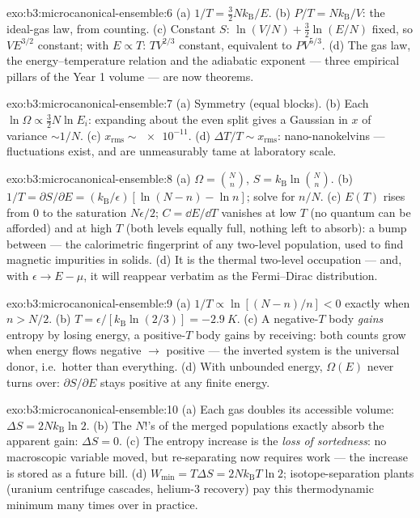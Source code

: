 \begin{solution}{exo:b3:microcanonical-ensemble:6}
(a) $1/T = \tfrac32 Nk_{\text{B}}/E$. (b) $P/T =
Nk_{\text{B}}/V$: the ideal-gas law, from counting. (c) Constant
$S$: $\ln(V/N) + \tfrac32\ln(E/N)$ fixed, so $VE^{3/2}$ constant;
with $E \propto T$: $TV^{2/3}$ constant, equivalent to
$PV^{5/3}$. (d) The gas law, the energy--temperature relation and
the adiabatic exponent --- three empirical pillars of the Year 1
volume --- are now theorems.
\end{solution}

\begin{solution}{exo:b3:microcanonical-ensemble:7}
(a) Symmetry (equal blocks). (b) Each $\ln\Omega \propto
\tfrac32 N\ln E_i$: expanding about the even split gives a
Gaussian in $x$ of variance $\sim1/N$. (c) $x_{\text{rms}} \sim
\num{e-11}$. (d) $\Delta T/T \sim x_{\text{rms}}$:
nano-nanokelvins --- fluctuations exist, and are unmeasurably
tame at laboratory scale.
\end{solution}

\begin{solution}{exo:b3:microcanonical-ensemble:8}
(a) $\Omega = \binom Nn$, $S = k_{\text{B}}\ln\binom Nn$. (b)
$1/T = \partial S/\partial E = (k_{\text{B}}/\epsilon)[\ln(N-n) -
\ln n]$; solve for $n/N$. (c) $E(T)$ rises from $0$ to the
saturation $N\epsilon/2$; $C = \dd E/\dd T$ vanishes at low $T$
(no quantum can be afforded) and at high $T$ (both levels equally
full, nothing left to absorb): a bump between --- the calorimetric
fingerprint of any two-level population, used to find magnetic
impurities in solids. (d) It is the thermal two-level occupation
--- and, with $\epsilon \to E - \mu$, it will reappear verbatim as
the Fermi--Dirac distribution.
\end{solution}

\begin{solution}{exo:b3:microcanonical-ensemble:9}
(a) $1/T \propto \ln[(N-n)/n] < 0$ exactly when $n > N/2$. (b)
$T = \epsilon/[k_{\text{B}}\ln(2/3)] = -\qty{2.9}{K}$. (c) A
negative-$T$ body \emph{gains} entropy by losing energy, a
positive-$T$ body gains by receiving: both counts grow when energy
flows negative $\to$ positive --- the inverted system is the
universal donor, i.e.\ hotter than everything. (d) With unbounded
energy, $\Omega(E)$ never turns over: $\partial S/\partial E$
stays positive at any finite energy.
\end{solution}

\begin{solution}{exo:b3:microcanonical-ensemble:10}
(a) Each gas doubles its accessible volume: $\Delta S =
2Nk_{\text{B}}\ln2$. (b) The $N!$'s of the merged populations
exactly absorb the apparent gain: $\Delta S = 0$. (c) The entropy
increase is the \emph{loss of sortedness}: no macroscopic variable
moved, but re-separating now requires work --- the increase is
stored as a future bill. (d) $W_{\min} = T\Delta S =
2Nk_{\text{B}}T\ln2$; isotope-separation plants (uranium
centrifuge cascades, helium-3 recovery) pay this thermodynamic
minimum many times over in practice.
\end{solution}

